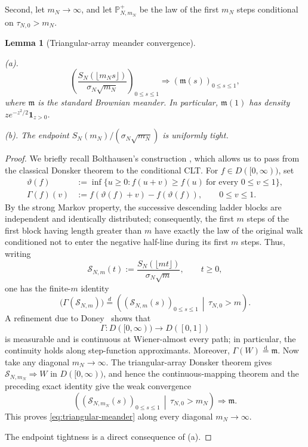 \documentclass[11pt]{article}
\theoremstyle{plain}
\newtheorem{lemma}{Lemma}[section]
\theoremstyle{definition}
\theoremstyle{remark}
\newcommand{\Pp}{\mathbb P}
\begin{document}
Second, let \(m_N\to\infty\), and let \(\Pp_{N,m_N}^{+}\) be the law of
the first \(m_N\) steps conditional on \(\tau_{N,0}>m_N\).  
\begin{lemma}[Triangular-array meander convergence]\label{lem:meanderconvergence}

\textup{(a).}
\begin{equation}
 \left(\frac{S_N(\lfloor m_Ns\rfloor)}
 {\sigma_N\sqrt{m_N}}\right)_{0\le s\le1}
 \Longrightarrow (\mathfrak m(s))_{0\le s\le1},
 \label{eq:triangular-meander}
\end{equation}
where \(\mathfrak m\) is the standard Brownian meander. 
In particular,
\(\mathfrak m(1)\) has density \(z e^{-z^2/2}\mathbf1_{z>0}\).

\textup{(b).}
The endpoint \(S_N(m_N)/(\sigma_N\sqrt{m_N})\) is uniformly tight.
\end{lemma}
\begin{proof}
We briefly recall Bolthausen's construction
\cite{BolthausenMeander}, which allows us to pass from the classical Donsker theorem to the conditional CLT.  For \(f\in D([0,\infty))\), set
\[
 \begin{aligned}
 \vartheta(f)
 &:=\inf\bigl\{u\ge0:
 f(u+v)\ge f(u)\ \text{for every }0\le v\le1\bigr\},\\
 \Gamma(f)(v)
 &:=f(\vartheta(f)+v)-f(\vartheta(f)),
 \qquad 0\le v\le1 .
 \end{aligned}
\]
By the strong Markov property,
the successive descending ladder blocks are independent and identically distributed;
consequently, the first \(m\) steps of the first block having length greater
than \(m\) have exactly the law of the original walk conditioned not to
enter the negative half-line during its first \(m\) steps.  Thus, writing
\[
 \mathcal S_{N,m}(t):=
 \frac{S_N(\lfloor mt\rfloor)}{\sigma_N\sqrt m},
 \qquad t\ge0,
\]
one has the finite-\(m\) identity
\[
 \bigl(\Gamma(\mathcal S_{N,m})\bigr)
  \stackrel{d}{=} 
 \left(
   (\mathcal S_{N,m}(s))_{0\le s\le1}
   \,\middle|\,\tau_{N,0}>m
 \right).
\]
A refinement due to Doney~\cite{DoneyConditional} shows that
\[
  \Gamma:D([0,\infty))\longrightarrow D([0,1])
\]
is measurable and is continuous at Wiener-almost every path; in
particular, the continuity holds along step-function approximants.
Moreover, \(\Gamma(W)\overset{\mathrm d}=\mathfrak m\). Now take any diagonal \(m_N\to\infty\).  The
triangular-array Donsker theorem gives
\(\mathcal S_{N,m_N}\Rightarrow W\) in \(D([0,\infty))\), and hence the
continuous-mapping theorem and the preceding exact identity give the weak convergence
\[
 \left(
   (\mathcal S_{N,m_N}(s))_{0\le s\le1}
   \,\middle|\,\tau_{N,0}>m_N
 \right)
 \Longrightarrow \mathfrak m.
\]
This proves \eqref{eq:triangular-meander} along every diagonal
\(m_N\to\infty\). 

The endpoint tightness is a direct consequence of (a).
\end{proof}
\end{document}
